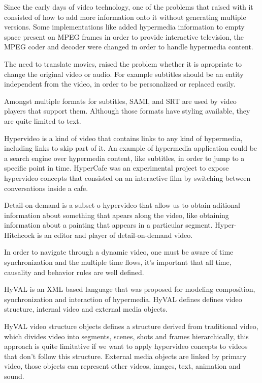 
  Since the early days of video technology, one of the problems that raised with it consisted of how to add more information onto it without generating multiple versions. Some implementations like \cite{embedded} added hypermedia information to empty space present on \ac{MPEG} frames in order to provide interactive television, the \ac{MPEG} coder and decoder were changed in order to handle hypermedia content.

  The need to translate movies, raised the problem whether it is apropriate to change the original video or audio. For example subtitles should be an entity independent from the video, in order to be personalized or replaced easily.
 
  Amongst multiple formats for subtitles, \ac{SAMI}, and \ac{SRT} are used by video players that support them. Although those formats have styling available, they are quite limited to text. 

  Hypervideo is a kind of video that contains links to any kind of hypermedia, including links to skip part of it. An example of hypermedia application could be a search engine over hypermedia content, like subtitles, in order to jump to a specific point in time. HyperCafe \cite{hypercafe} was an experimental project to expose hypervideo concepts that consisted on an interactive film by switching between conversations inside a cafe.

  Detail-on-demand is a subset o hypervideo that allow us to obtain aditional information about something that apears along the video, like obtaining information about a painting that appears in a particular segment. Hyper-Hitchcock\cite{hitchcock} is an editor and player of detail-on-demand video.

  In order to navigate through a dynamic video, one must be aware of time synchronization and the multiple time flows, it's important that all time, causality and behavior rules are well defined.
 
  HyVAL\cite{hyval} is an \ac{XML} based language that was proposed for modeling composition, synchronization and interaction of hypermedia. HyVAL defines defines video structure, internal video and external media objects. 

  HyVAL video structure objects defines a structure derived from traditional video, which divides video into segments, scenes, shots and frames hierarchically, this approach is quite limitative if we want to apply hypervideo concepts to videos that don't follow this structure. External media objects are linked by primary video, those objects can represent other videos, images, text, animation and sound.

